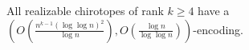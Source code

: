 \begin{contribution}[label=thm:realizable-d,restate=TheoremGPTRealizableD]
  All realizable chirotopes of rank \(k \geq 4\) have a
  \((O(\frac{n^{k-1}{(\log{\log{n}})}^2}{\log n}),
  O(\frac{\log{n}}{\log{\log{n}}}))\)-encoding.
\end{contribution}
